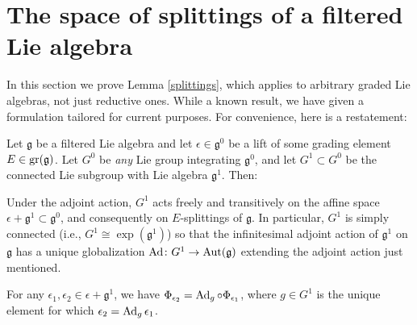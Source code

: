 \documentclass[leqno,12pt]{amsart} %
\newcommand\refreshpage{\newpage}
\newcommand\refreshpage{}
\begin{document}
\refreshpage
\section{The space of splittings of a filtered Lie algebra}
\label{appendix_splittings}
In this section we prove Lemma \ref{splittings}, which applies to arbitrary graded Lie
algebras, not just reductive ones. While a known result, we have given a formulation
tailored for current purposes. For convenience, here is a restatement:

\begin{lemma}
  Let $\mathfrak g$ be a filtered Lie algebra and let $\epsilon \in {\mathfrak g}^0 $ be a
  lift of some grading element $E \in \operatorname{\operatorname{gr}}({\mathfrak g})$. Let $G^0$ be {\em any} Lie
  group integrating ${\mathfrak g}^0 $, and let $G^1 \subset G^0$ be the connected Lie
  subgroup with Lie algebra ${\mathfrak g}^1$. Then:
  \begin{conditions}
  \item Under the adjoint action, $G^1$ acts freely and transitively on the affine space
    $\epsilon + {\mathfrak g}^1\subset {\mathfrak g}^0$, and consequently on $E$-splittings of
    ${\mathfrak g} $. In particular, $G^1$ is simply connected (i.e.,
    $G^1 \cong \exp({\mathfrak g}^1)$) so that the infinitesimal adjoint action of
    ${\mathfrak g}^1$ on ${\mathfrak g} $ has a unique globalization
    $\operatorname{Ad}\colon G^1 \rightarrow \operatorname{Aut}({\mathfrak g})$ extending the adjoint
    action just mentioned.\label{splittings1_}
  \item For any $\epsilon_1, \epsilon_2 \in \epsilon + {\mathfrak g}^1$, we have
    $\Phi_{\epsilon_2} = \operatorname{Ad}_g\circ \Phi_{\epsilon_1}$, where $g \in G^1$ is the unique element for
    which $\epsilon_2 = \operatorname{Ad}_g \epsilon_1$. \label{splittings2_}
  \end{conditions}
\end{lemma}
\end{document}
